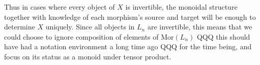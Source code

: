 \documentclass{amsbook} %
\numberwithin{section}{chapter}
\begin{document}
Thus in cases where every object of $X$ is invertible, the monoidal structure together with knowledge of each morphism's source and target will be enough to determine $X$ uniquely. Since all objects in $L_n$ are invertible, this means that we could choose to ignore composition of elements of $\mathrm{Mor}(L_n)$ QQQ this should have had a notation environment a long time ago QQQ for the time being, and focus on its status as a monoid under tensor product.

\end{document}

